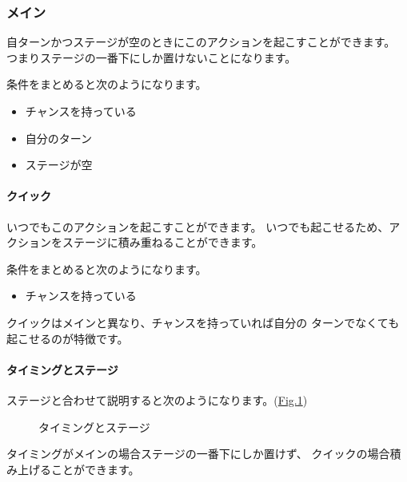 \documentclass[letterpaper,10pt,dvipdfmx]{sphinxmanual}
\begin{document}
\subsubsection{メイン}
\label{\detokenize{common/03-action:id22}}
自ターンかつステージが空のときにこのアクションを起こすことができます。
つまりステージの一番下にしか置けないことになります。

条件をまとめると次のようになります。
\begin{itemize}
\item {} 
チャンスを持っている

\item {} 
自分のターン

\item {} 
ステージが空

\end{itemize}


\paragraph{クイック}
\label{\detokenize{common/03-action:id23}}
いつでもこのアクションを起こすことができます。
いつでも起こせるため、アクションをステージに積み重ねることができます。

条件をまとめると次のようになります。
\begin{itemize}
\item {} 
チャンスを持っている

\end{itemize}

クイックはメインと異なり、チャンスを持っていれば自分の
ターンでなくても起こせるのが特徴です。


\paragraph{タイミングとステージ}
\label{\detokenize{common/03-action:id24}}
ステージと合わせて説明すると次のようになります。(\hyperref[\detokenize{common/03-action:timing}]{Fig.\@ \ref{\detokenize{common/03-action:timing}}})

\begin{figure}[htbp]
\centering
\capstart

\noindent{}
\caption{タイミングとステージ}\label{\detokenize{common/03-action:id36}}\label{\detokenize{common/03-action:timing}}\end{figure}

タイミングがメインの場合ステージの一番下にしか置けず、
クイックの場合積み上げることができます。
\end{document}
